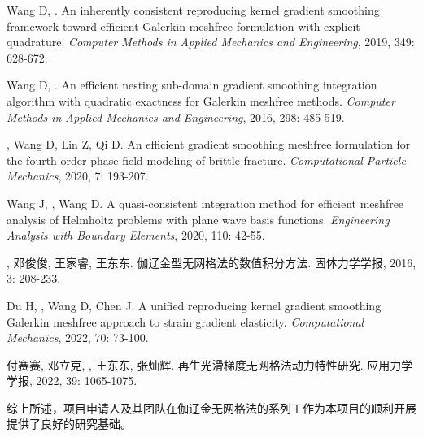 \vspace{-50pt}
\begin{thebibliography}{1}
	Wang D, .
	\newblock An inherently consistent reproducing kernel gradient smoothing
	  framework toward efficient {{Galerkin}} meshfree formulation with explicit
	  quadrature.
	\newblock \emph{Computer Methods in Applied Mechanics and Engineering}, 2019,
	  349: 628-672.

	Wang D, .
	\newblock An efficient nesting sub-domain gradient smoothing integration
	  algorithm with quadratic exactness for {{Galerkin}} meshfree methods.
	\newblock \emph{Computer Methods in Applied Mechanics and Engineering}, 2016,
	  298: 485-519.

	, Wang D, Lin Z, Qi D.
	\newblock An efficient gradient smoothing meshfree formulation for the
	  fourth-order phase field modeling of brittle fracture.
	\newblock \emph{Computational Particle Mechanics}, 2020, 7: 193-207.

	Wang J, , Wang D.
	\newblock A quasi-consistent integration method for efficient meshfree analysis
	  of {{Helmholtz}} problems with plane wave basis functions.
	\newblock \emph{Engineering Analysis with Boundary Elements}, 2020, 110: 42-55.

	\textbf{}, 邓俊俊, 王家睿, 王东东.
	\newblock 伽辽金型无网格法的数值积分方法.
	\newblock 固体力学学报, 2016, 3: 208-233.

	Du H, , Wang D, Chen J.
	\newblock A unified reproducing kernel gradient smoothing {{Galerkin}} meshfree
	  approach to strain gradient elasticity.
	\newblock \emph{Computational Mechanics}, 2022, 70: 73-100.

	付赛赛, 邓立克, \textbf{}, 王东东, 张灿辉.
	\newblock 再生光滑梯度无网格法动力特性研究.
	\newblock 应用力学学报, 2022, 39: 1065-1075.

\end{thebibliography}

综上所述，项目申请人及其团队在伽辽金无网格法的系列工作为本项目的顺利开展提供了良好的研究基础。

